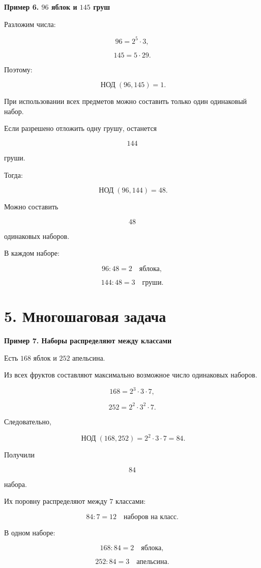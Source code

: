 \documentclass[a4paper,12pt]{article}
\newcommand{\mygcd}[2]{
  \mathop{\text{НОД}}\nolimits(#1,#2)
}
\newcommand{\exampletitle}[1]{
  \medskip
  \textbf{\textcolor{accent}{#1}}
  \par
  \smallskip
}
\begin{document}
\exampletitle{
Пример 6. $96$ яблок и $145$ груш
}

Разложим числа:

\[
96=2^5\cdot3,
\]

\[
145=5\cdot29.
\]

Поэтому:

\[
\mygcd{96}{145}=1.
\]

При использовании всех предметов
можно составить только один одинаковый набор.

Если разрешено отложить одну грушу,
останется

\[
144
\]

груши.

Тогда:

\[
\mygcd{96}{144}=48.
\]

Можно составить

\[
48
\]

одинаковых наборов.

В каждом наборе:

\[
96:48=2
\quad
\text{яблока},
\]

\[
144:48=3
\quad
\text{груши}.
\]


\section*{5. Многошаговая задача}

\exampletitle{
Пример 7. Наборы распределяют между классами
}

Есть $168$ яблок и $252$ апельсина.

Из всех фруктов составляют
максимально возможное число одинаковых наборов.

\[
168=2^3\cdot3\cdot7,
\]

\[
252=2^2\cdot3^2\cdot7.
\]

Следовательно,

\[
\mygcd{168}{252}
=
2^2\cdot3\cdot7
=
84.
\]

Получили

\[
84
\]

набора.

Их поровну распределяют
между $7$ классами:

\[
84:7=12
\quad
\text{наборов на класс}.
\]

В одном наборе:

\[
168:84=2
\quad
\text{яблока},
\]

\[
252:84=3
\quad
\text{апельсина}.
\]
\end{document}
